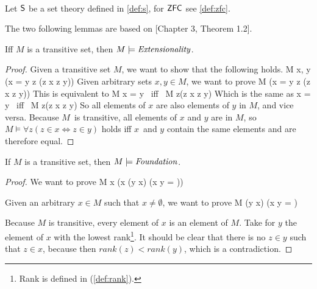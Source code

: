 

\

Let $\sf{S}$ be a set theory defined in \ref{def:s}, for $\sf{ZFC}$ see \ref{def:zfc}.


The two following lemmas are based on \cite{DrakeBook}[Chapter 3, Theorem 1.2].
\begin{lemma}\label{lemma:extensionality_in_transitive} %
Iff $M$ is a transitive set, then $M \models \mbox{\emph{Extensionality}}$.
\end{lemma}

\begin{proof}
Given a transitive set $M$, we want to show that the following holds.
\beq
M \models \forall x, y (x = y \iff \forall z (z \in x \iff z \in y))
\eeq %
Given arbitrary sets $x, y \in M$, we want to prove
\beq
M \models (x = y \iff \forall z (z \in x \iff z \in y))
\eeq
This is equivalent to %
\beq
M \models x = y \mbox{ iff } M \models \forall z(z \in x \iff z \in y)
\eeq
Which is the same as 
\beq
x = y \mbox{ iff } M \models \forall z(z \in x \iff z \in y)
\eeq
So all elements of $x$ are also elements of $y$ in $M$, and vice versa.  Because $M$ is transitive, all elements of $x$ and $y$ are in $M$, so $M \models \forall z(z \in x \iff z \in y)$ holds iff $x$ and $y$ contain the same elements and are therefore equal.
\end{proof}

\begin{lemma}\label{lemma:foundation_in_transitive}
If $M$ is a transitive set, then $M \models \mbox{\emph{Foundation}}$.
\end{lemma}

\begin{proof}
We want to prove
\beq
M \models \forall x (x \neq \emptyset \then (\exists y \in x) (x \cap y = \emptyset))
\eeq

Given an arbitrary $x \in M$ such that $x \neq \emptyset$, we want to prove
\beq
M \models (\exists y \in x) (x \cap y = \emptyset)
\eeq

Because $M$ is transitive, every element of $x$ is an element of $M$. Take for $y$ the element of $x$ with the lowest rank\footnote{Rank is defined in (\ref{def:rank}).}. It should be clear that there is no $z \in y$ such that $z \in x$, because then $rank(z) < rank(y)$, which is a contradiction.
\end{proof}

